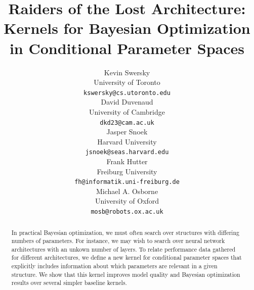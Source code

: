 \documentclass{article}
\newcommand{\note}[1]{}
\begin{document}
\title{Raiders of the Lost Architecture:\\Kernels for Bayesian Optimization in Conditional Parameter Spaces}

\author{
Kevin Swersky \\
University of Toronto \\
{\small \texttt{kswersky@cs.utoronto.edu}} \\
\And
David Duvenaud \\
University of Cambridge \\
{\small \texttt{dkd23@cam.ac.uk}} \\
\And
Jasper Snoek\\
Harvard University \\
{\small \texttt{jsnoek@seas.harvard.edu}} \\
\AND
Frank Hutter  \\
Freiburg University \\
{\small {\tt fh@informatik.uni-freiburg.de}} \\
\And
Michael A. Osborne \\
University of Oxford \\
{\small{\tt mosb@robots.ox.ac.uk}} \\
}




\maketitle
\begin{abstract}
In practical Bayesian optimization, we must often search over structures with differing numbers of parameters.  For instance, we may wish to search over neural network architectures with an unkown number of layers.  To relate performance data gathered for different architectures, we define a new kernel for conditional parameter spaces that explicitly includes information about which parameters are relevant in a given structure. We show that this kernel improves model quality and Bayesian optimization results over several simpler baseline kernels.
\end{abstract}


\end{document}
